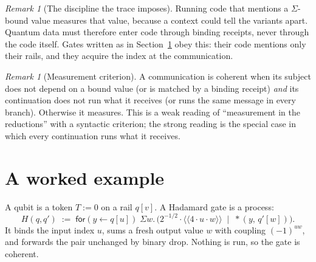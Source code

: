 \documentclass[11pt,a4paper]{article}
\theoremstyle{plain}
\theoremstyle{definition}
\theoremstyle{remark}
\newtheorem{remark}[theorem]{Remark}
\newcommand{\cpl}[1]{\langle\!\langle #1 \rangle\!\rangle}
\newcommand{\rcv}[3]{\mathsf{for}(#1 \leftarrow #2)#3}
\newcommand{\bdrop}[2]{{*}(#1,\,#2)}
\newcommand{\Sig}[2]{\Sigma #1.\,#2}
\begin{document}
\begin{remark}[The discipline the trace imposes]
Running code that mentions a $\Sigma$-bound value measures that value, because
a context could tell the variants apart. Quantum data must therefore enter code
through binding receipts, never through the code itself. Gates written as in
Section~\ref{sec:example} obey this: their code mentions only their rails, and
they acquire the index at the communication.
\end{remark}

\begin{remark}[Measurement criterion]
A communication is coherent when its subject does not depend on a bound value
(or is matched by a binding receipt) \emph{and} its continuation does not run
what it receives (or runs the same message in every branch). Otherwise it
measures. This is a weak reading of ``measurement in the reductions'' with a
syntactic criterion; the strong reading is the special case in which every
continuation runs what it receives.
\end{remark}

\section{A worked example}\label{sec:example}

A qubit is a token $T := 0$ on a rail $q[v]$. A Hadamard gate is a process:
\[
  H(q,q') \;:=\; \rcv{y}{q[u]}{\;\Sig{w}{\big(2^{-1/2}\cdot\cpl{4\cdot u\cdot w}
  \;\mid\; \bdrop{y}{q'[w]}\big)}}.
\]
It binds the input index $u$, sums a fresh output value $w$ with coupling
$(-1)^{uw}$, and forwards the pair unchanged by binary drop. Nothing is run, so
the gate is coherent.
\end{document}
